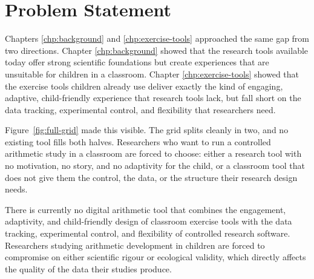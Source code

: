 \chapter{Problem Statement}
\label{chp:problem-statement}

Chapters \ref{chp:background} and \ref{chp:exercise-tools} approached the same gap from two directions. Chapter \ref{chp:background} showed that the research tools available today offer strong scientific foundations but create experiences that are unsuitable for children in a classroom. Chapter \ref{chp:exercise-tools} showed that the exercise tools children already use deliver exactly the kind of engaging, adaptive, child-friendly experience that research tools lack, but fall short on the data tracking, experimental control, and flexibility that researchers need.

Figure~\ref{fig:full-grid} made this visible. The grid splits cleanly in two, and no existing tool fills both halves. Researchers who want to run a controlled arithmetic study in a classroom are forced to choose: either a research tool with no motivation, no story, and no adaptivity for the child, or a classroom tool that does not give them the control, the data, or the structure their research design needs.

\begin{tcolorbox}[
    colback=red!5!white,
    colframe=red!70!black,
    title=Problem
]
There is currently no digital arithmetic tool that combines the engagement, adaptivity, and child-friendly design of classroom exercise tools with the data tracking, experimental control, and flexibility of controlled research software. Researchers studying arithmetic development in children are forced to compromise on either scientific rigour or ecological validity, which directly affects the quality of the data their studies produce.
\end{tcolorbox}


